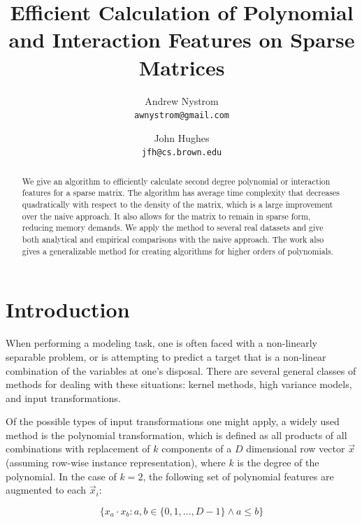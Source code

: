 \documentclass[11pt,onecolumn]{article}
\begin{document}
\title{Efficient Calculation of Polynomial and Interaction Features on Sparse Matrices}
\author{
  Andrew Nystrom\\
  \texttt{awnystrom@gmail.com}
  \and
  John Hughes\\
  \texttt{jfh@cs.brown.edu}
}
\date{}

\maketitle

\begin{abstract}%
We give an algorithm to efficiently calculate second degree polynomial or interaction features for a sparse matrix.
The algorithm has average time complexity that decreases quadratically with respect to the density of the matrix, which
is a large improvement over the naive approach. It also allows for the matrix to remain in sparse form, reducing memory demands.
We apply the method to several real datasets and give both analytical and empirical comparisons with the
naive approach. The work also gives a generalizable method for creating algorithms for higher orders of polynomials.
\end{abstract}

\section{Introduction}

When performing a modeling task, one is often faced with a non-linearly separable problem,
or is attempting to predict a target that is a non-linear combination of the variables at one's disposal.
There are several general classes of methods for dealing with these situations: kernel methods, 
high variance models, and input transformations.

Of the possible types of input transformations one
might apply, a widely used method is the polynomial transformation, which is defined as 
all products of all combinations with replacement of $k$ components of a $D$ dimensional row vector $\vec{x}$ (assuming row-wise instance representation), where $k$ is the degree of the polynomial.
In the case of $k=2$, the following set of polynomial features are augmented to each $\vec{x}_i$:

\begin{equation*}
\{x_a \cdot x_b : a, b \in \{0,1,..., D-1\} \land a \le b\}
\end{equation*}
\end{document}

